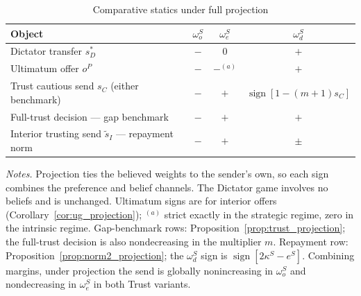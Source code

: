 \documentclass[11pt]{article}
\theoremstyle{plain}
\theoremstyle{remark}
\newcommand{\sgn}{\operatorname{sign}}
\begin{document}
\begin{table}[ht]
\centering
\small
\renewcommand{\arraystretch}{1.25}
\caption{Comparative statics under full projection}
\label{tab:first_mover_projection}
\begin{tabular}{l ccc}
\toprule
Object & $\omega_o^S$ & $\omega_e^S$ & $\omega_d^S$ \\
\midrule
Dictator transfer $s_D^\ast$ & $-$ & $0$ & $+$ \\
Ultimatum offer $o^P$ & $-$ & $-^{(a)}$ & $+$ \\
Trust cautious send $s_C$ (either benchmark) & $-$ & $+$ & $\sgn[1-(m+1)s_C]$ \\
Full-trust decision --- gap benchmark & $-$ & $+$ & $+$ \\
Interior trusting send $\tilde s_I$ --- repayment norm & $-$ & $+$ & $\pm$ \\
\bottomrule
\end{tabular}

\vspace{5pt}
\parbox{0.94\textwidth}{\footnotesize
\emph{Notes.}  Projection ties the believed weights to the sender's own, so each sign combines the preference and belief channels.  The Dictator game involves no beliefs and is unchanged.  Ultimatum signs are for interior offers (Corollary~\ref{cor:ug_projection}); $^{(a)}$ strict exactly in the strategic regime, zero in the intrinsic regime.  Gap-benchmark rows: Proposition~\ref{prop:trust_projection}; the full-trust decision is also nondecreasing in the multiplier $m$.  Repayment row: Proposition~\ref{prop:norm2_projection}; the $\omega_d^S$ sign is $\sgn[2\kappa^S-e^S]$.  Combining margins, under projection the send is globally nonincreasing in $\omega_o^S$ and nondecreasing in $\omega_e^S$ in both Trust variants.}
\end{table}
\end{document}
